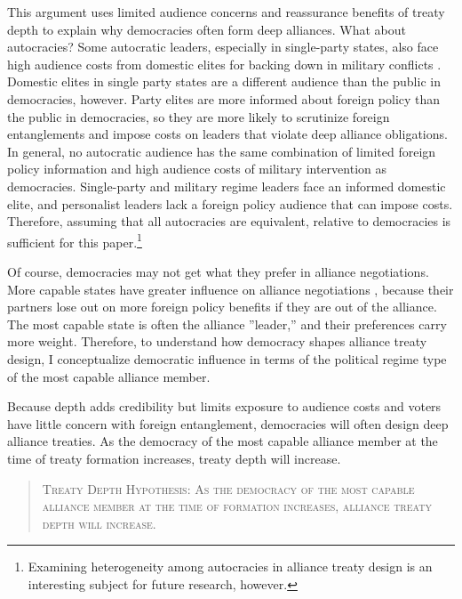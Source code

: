 \documentclass[12pt]{article}
\begin{document}
This argument uses limited audience concerns and reassurance benefits of treaty depth to explain why democracies often form deep alliances. 
What about autocracies? 
Some autocratic leaders, especially in single-party states, also face high audience costs from domestic elites for backing down in military conflicts \citep{Weeks2014}.
Domestic elites in single party states are a different audience than the public in democracies, however.  
Party elites are more informed about foreign policy than the public in democracies, so they are more likely to scrutinize foreign entanglements and impose costs on leaders that violate deep alliance obligations. 
In general, no autocratic audience has the same combination of limited foreign policy information and high audience costs of military intervention as democracies.
Single-party and military regime leaders face an informed domestic elite, and personalist leaders lack a foreign policy audience that can impose costs. 
Therefore, assuming that all autocracies are equivalent, relative to democracies is sufficient for this paper.\footnote{Examining heterogeneity among autocracies in alliance treaty design is an interesting subject for future research, however.} 


Of course, democracies may not get what they prefer in alliance negotiations. 
More capable states have greater influence on alliance negotiations \citep{Mattes2012}, because their partners lose out on more foreign policy benefits if they are out of the alliance.
The most capable state is often the alliance ''leader,'' and their preferences carry more weight. 
Therefore, to understand how democracy shapes alliance treaty design, I conceptualize democratic influence in terms of the political regime type of the most capable alliance member. 


Because depth adds credibility but limits exposure to audience costs and voters have little concern with foreign entanglement, democracies will often design deep alliance treaties. 
As the democracy of the most capable alliance member at the time of treaty formation increases, treaty depth will increase. 


\begin{quote}
\textsc{Treaty Depth Hypothesis: As the democracy of the most capable alliance member at the time of formation increases, alliance treaty depth will increase.}
\end{quote} 
\end{document}
